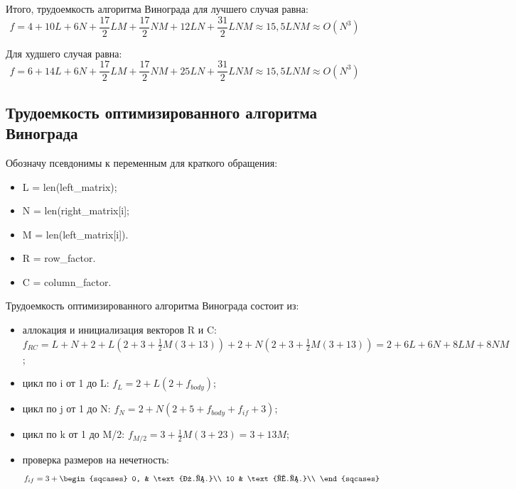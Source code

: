Итого, трудоемкость алгоритма Винограда для лучшего случая равна:
\begin{equation}
	f = 4 + 10L + 6N + \frac{17}{2}LM + \frac{17}{2}NM + 12LN + \frac{31}{2}LNM \approx 15,5LNM \approx O(N^3)
\end{equation}

Для худшего случая равна:
\begin{equation}
	f = 6 + 14L + 6N + \frac{17}{2}LM + \frac{17}{2}NM + 25LN + \frac{31}{2}LNM \approx 15,5LNM \approx O(N^3)
\end{equation}

\subsection{Трудоемкость оптимизированного алгоритма Винограда}

Обозначу псевдонимы к переменным для краткого обращения:
\begin{itemize}
	\item L = len(left\_matrix);
	\item N = len(right\_matrix[i];
	\item M = len(left\_matrix[i]).
	\item R = row\_factor.
	\item C = column\_factor.
\end{itemize}

Трудоемкость оптимизированного алгоритма Винограда состоит из:
\begin{itemize}
    \item аллокация и инициализация векторов R и C: $f_{RC} = L + N + 2 + L(2 + 3 + \frac{1}{2}M(3 + 13)) + 2 + N(2 + 3 + \frac{1}{2}M(3 + 13)) = 2 + 6L + 6N + 8LM + 8NM$;
    \item цикл по i от 1 до L: $f_{L} = 2 + L(2 + f_{body})$;
    \item цикл по j от 1 до N: $f_{N} = 2 + N(2 + 5 + f_{body} + f_{if} + 3)$;
    \item цикл по k от 1 до M/2: $f_{M/2} = 3 + \frac{1}{2}M(3 + 23) = 3 + 13M$;
    \item проверка размеров на нечетность:
    \begin{equation}
    	f_{if} = 3 + \begin{sqcases}
    			0, & \text{л.с.}\\
    			10 & \text{х.с.}\\
    		\end{sqcases}
    \end{equation}
\end{itemize} 

